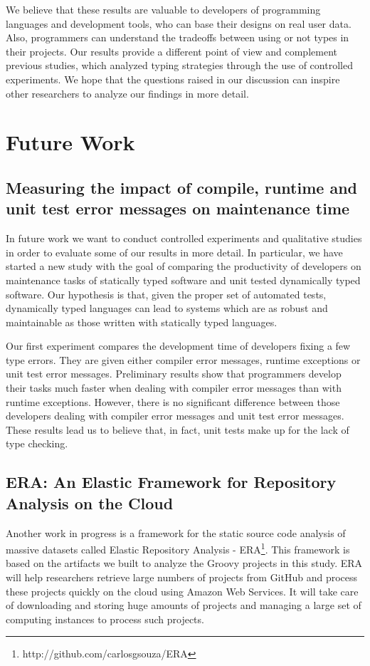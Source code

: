 \documentclass[msc]{ppgccufmg}
\begin{document}
We believe that these results are valuable to developers of programming languages and development tools, who can base their designs on real user data.
Also, programmers can understand the tradeoffs between using or not types in their projects.
Our results provide a different point of view and complement previous studies, which analyzed typing strategies through the use of controlled experiments. 
We hope that the questions raised in our discussion can inspire other researchers to analyze our findings in more detail.

\section{Future Work\label{sec:future}}
\subsection*{Measuring the impact of compile, runtime and unit test error messages on maintenance time}
In future work we want to conduct controlled experiments and qualitative studies in order to evaluate some of our results in more detail.
In particular, we have started a new study with the goal of comparing the productivity of developers on maintenance tasks of statically typed software and unit tested dynamically typed software.
Our hypothesis is that, given the proper set of automated tests, dynamically typed languages can lead to systems which are as robust and maintainable as those written with statically typed languages.

Our first experiment compares the development time of developers fixing a few type errors.
They are given either compiler error messages, runtime exceptions or unit test error messages.
Preliminary results show that programmers develop their tasks much faster when dealing with compiler error messages than with runtime exceptions.
However, there is no significant difference between those developers dealing with compiler error messages and unit test error messages.
These results lead us to believe that, in fact, unit tests make up for the lack of type checking.

\subsection*{ERA: An Elastic Framework for Repository Analysis on the Cloud}
Another work in progress is a framework for the static source code analysis of massive datasets called Elastic Repository Analysis - ERA\footnote{http://github.com/carlosgsouza/ERA}.
This framework is based on the artifacts we built to analyze the Groovy projects in this study.
ERA will help researchers retrieve large numbers of projects from GitHub and process these projects quickly on the cloud using Amazon Web Services.
It will take care of downloading and storing huge amounts of projects and managing a large set of computing instances to process such projects.
\end{document}
